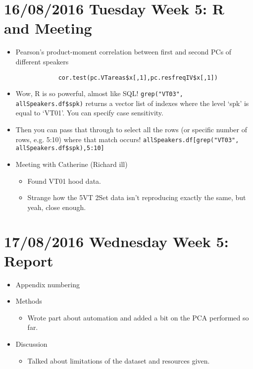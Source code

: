 \documentclass{article}
\begin{document}
\section*{16/08/2016 Tuesday Week 5: R and Meeting}
\begin{itemize}
    \item Pearson's product-moment correlation between first and second PCs of different speakers \begin{verbatim}
            cor.test(pc.VTareas$x[,1],pc.resfreqIV$x[,1])
        \end{verbatim}
    \item Wow, R is so powerful, almost like SQL! \verb|grep("VT03", allSpeakers.df$spk)| returns a vector list of indexes where the level `spk' is equal to `VT01'. You can specify case sensitivity.
    \item Then you can pass that through to select all the rows (or specific number of rows, e.g. 5:10) where that match occurs! \verb|allSpeakers.df[grep("VT03", allSpeakers.df$spk),5:10]|
    \item Meeting with Catherine (Richard ill)
    \begin{itemize}
        \item Found VT01 hood data.
        \item Strange how the 5VT 2Set data isn't reproducing exactly the same, but yeah, close enough.
    \end{itemize}
\end{itemize}

\section*{17/08/2016 Wednesday Week 5: Report}
\begin{itemize}
    \item Appendix numbering
    \item Methods
    \begin{itemize}
        \item Wrote part about automation and added a bit on the PCA performed so far.
    \end{itemize}
    \item Discussion
    \begin{itemize}
        \item Talked about limitations of the dataset and resources given.
    \end{itemize}
\end{itemize}
\end{document}
